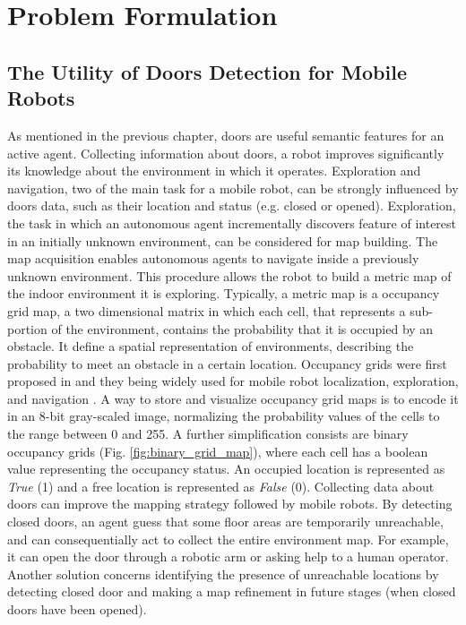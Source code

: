 \chapter{Problem Formulation}
\label{capitolo3}
\thispagestyle{empty}

\section{The Utility of Doors Detection for Mobile Robots}

As mentioned in the previous chapter, doors are useful semantic features for an active agent. Collecting information about doors, a robot improves significantly its knowledge about the environment in which it operates. Exploration and navigation, two of the main task for a mobile robot, can be strongly influenced by doors data, such as their location and status (e.g. closed or opened). Exploration, the task in which an autonomous agent incrementally discovers feature of interest in an initially unknown environment, can be considered for map building.  The map acquisition enables autonomous agents to navigate inside a previously unknown environment. This procedure allows the robot to build a metric map of the indoor environment it is exploring. Typically, a metric map is a occupancy grid map, a two dimensional matrix in which each cell, that represents a sub-portion of the environment, contains the probability that it is occupied by an obstacle. It define a spatial representation of environments, describing the probability to meet an obstacle in a certain location. Occupancy grids were first proposed in \cite{cuupancygridfirst} and they being widely used for mobile robot localization, exploration, and navigation \cite{gridmapnavigation, ariel, girdmapexploration}. A way to store and visualize occupancy grid maps is to encode it in an 8-bit gray-scaled image, normalizing the probability values of the cells to the range between 0
and 255. A further simplification consists are binary occupancy grids (Fig. \ref{fig:binary_grid_map}), where each cell has a boolean value representing the occupancy status. An occupied location is represented as \textit{True} (1) and a free location is represented as \textit{False} (0). Collecting data about doors can improve the mapping strategy followed by mobile robots. By detecting closed doors, an agent guess that some floor areas are temporarily unreachable, and can consequentially act to collect the entire environment map. For example, it can open the door through a robotic arm \cite{doorcabinet} or asking help to a human operator. Another solution concerns identifying the presence of unreachable locations by detecting closed door and making a map refinement in future stages (when closed doors have been opened).

